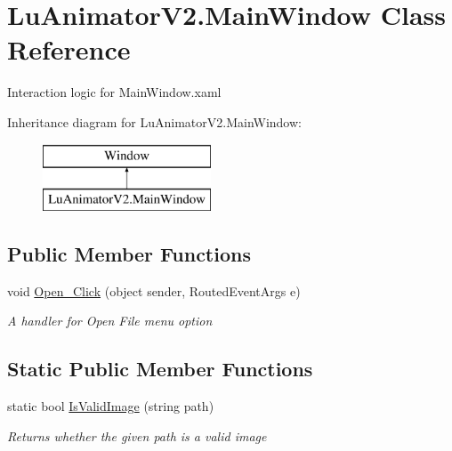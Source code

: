 \hypertarget{class_lu_animator_v2_1_1_main_window}{}\section{Lu\+Animator\+V2.\+Main\+Window Class Reference}
\label{class_lu_animator_v2_1_1_main_window}


Interaction logic for Main\+Window.\+xaml  


Inheritance diagram for Lu\+Animator\+V2.\+Main\+Window\+:\begin{figure}[H]
\begin{center}
\leavevmode
\includegraphics[height=2.000000cm]{class_lu_animator_v2_1_1_main_window}
\end{center}
\end{figure}
\subsection*{Public Member Functions}
\begin{DoxyCompactItemize}
\item 
void \hyperlink{class_lu_animator_v2_1_1_main_window_a24f05f16c39805c58885169377a3817b}{Open\+\_\+\+Click} (object sender, Routed\+Event\+Args e)
\begin{DoxyCompactList}\small\item\em A handler for Open File menu option \end{DoxyCompactList}\end{DoxyCompactItemize}
\subsection*{Static Public Member Functions}
\begin{DoxyCompactItemize}
\item 
static bool \hyperlink{class_lu_animator_v2_1_1_main_window_aeb67233dd3b8a17a1365881c637c9b10}{Is\+Valid\+Image} (string path)
\begin{DoxyCompactList}\small\item\em Returns whether the given path is a valid image \end{DoxyCompactList}\end{DoxyCompactItemize}
